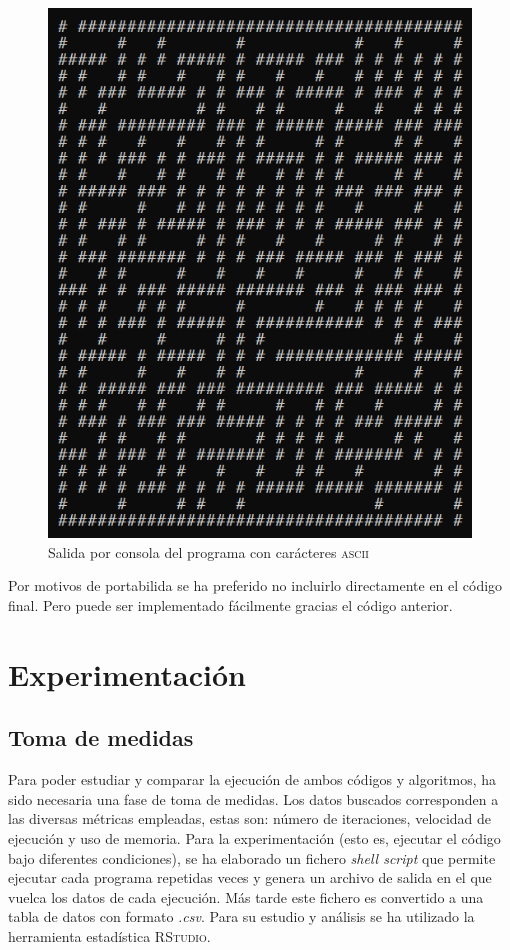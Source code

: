 \documentclass[12pt,a4paper]{article}
\begin{document}
\begin{figure}
	\centering
	\includegraphics[scale=0.6]{fotos/ascii.png}
	\caption{Salida por consola del programa con carácteres \textsc{ascii}}
	\label{ascii}
\end{figure}

Por motivos de portabilida se ha preferido no incluirlo directamente en el código final. Pero puede ser implementado fácilmente gracias el código anterior.

\clearpage
\section{Experimentación}
\subsection{Toma de medidas}
Para poder estudiar y comparar la ejecución de ambos códigos y algoritmos, ha sido necesaria una fase de toma de medidas. Los datos buscados corresponden a las diversas métricas empleadas, estas son: número de iteraciones, velocidad de ejecución y uso de memoria. Para la experimentación (esto es, ejecutar el código bajo diferentes condiciones), se ha elaborado un fichero \textit{shell script} que permite ejecutar cada programa repetidas veces y genera un archivo de salida en el que vuelca los datos de cada ejecución. Más tarde este fichero es convertido a una tabla de datos con formato \textit{.csv}. Para su estudio y análisis se ha utilizado la herramienta estadística \textsc{RStudio}.
\end{document}
